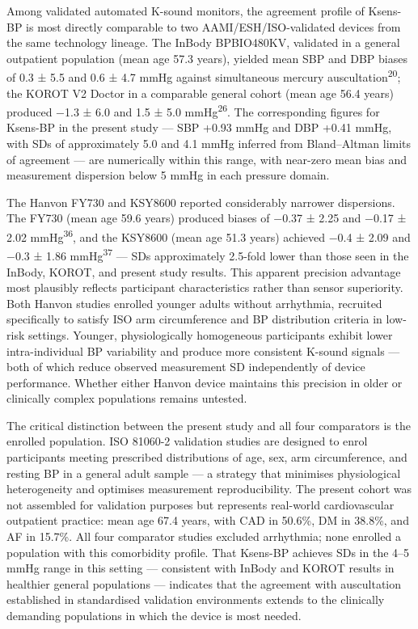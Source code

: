\documentclass[
  12pt,
  letterpaper,
  openany,
  oneside]{book}
\begin{document}
Among validated automated K-sound monitors, the agreement profile of
Ksens-BP is most directly comparable to two AAMI/ESH/ISO-validated
devices from the same technology lineage. The InBody BPBIO480KV,
validated in a general outpatient population (mean age 57.3 years),
yielded mean SBP and DBP biases of 0.3 ± 5.5 and 0.6 ± 4.7 mmHg against
simultaneous mercury auscultation\textsuperscript{20}; the KOROT V2
Doctor in a comparable general cohort (mean age 56.4 years) produced
−1.3 ± 6.0 and 1.5 ± 5.0 mmHg\textsuperscript{26}. The corresponding
figures for Ksens-BP in the present study --- SBP +0.93 mmHg and DBP
+0.41 mmHg, with SDs of approximately 5.0 and 4.1 mmHg inferred from
Bland--Altman limits of agreement --- are numerically within this range,
with near-zero mean bias and measurement dispersion below 5 mmHg in each
pressure domain.

The Hanvon FY730 and KSY8600 reported considerably narrower dispersions.
The FY730 (mean age 59.6 years) produced biases of −0.37 ± 2.25 and
−0.17 ± 2.02 mmHg\textsuperscript{36}, and the KSY8600 (mean age 51.3
years) achieved −0.4 ± 2.09 and −0.3 ± 1.86 mmHg\textsuperscript{37} ---
SDs approximately 2.5-fold lower than those seen in the InBody, KOROT,
and present study results. This apparent precision advantage most
plausibly reflects participant characteristics rather than sensor
superiority. Both Hanvon studies enrolled younger adults without
arrhythmia, recruited specifically to satisfy ISO arm circumference and
BP distribution criteria in low-risk settings. Younger, physiologically
homogeneous participants exhibit lower intra-individual BP variability
and produce more consistent K-sound signals --- both of which reduce
observed measurement SD independently of device performance. Whether
either Hanvon device maintains this precision in older or clinically
complex populations remains untested.

The critical distinction between the present study and all four
comparators is the enrolled population. ISO 81060-2 validation studies
are designed to enrol participants meeting prescribed distributions of
age, sex, arm circumference, and resting BP in a general adult sample
--- a strategy that minimises physiological heterogeneity and optimises
measurement reproducibility. The present cohort was not assembled for
validation purposes but represents real-world cardiovascular outpatient
practice: mean age 67.4 years, with CAD in 50.6\%, DM in 38.8\%, and AF
in 15.7\%. All four comparator studies excluded arrhythmia; none
enrolled a population with this comorbidity profile. That Ksens-BP
achieves SDs in the 4--5 mmHg range in this setting --- consistent with
InBody and KOROT results in healthier general populations --- indicates
that the agreement with auscultation established in standardised
validation environments extends to the clinically demanding populations
in which the device is most needed.
\end{document}
